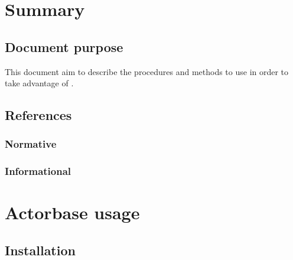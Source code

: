 \documentclass{scalatekids-article}
\begin{document}
\section{Summary}
\subsection{Document purpose}
This document aim to describe the procedures and methods to use in order to take advantage of .

\subsection{References}

\subsubsection{Normative} %

\subsubsection{Informational} %









\section{Actorbase usage}

\subsection{Installation}
\end{document}
